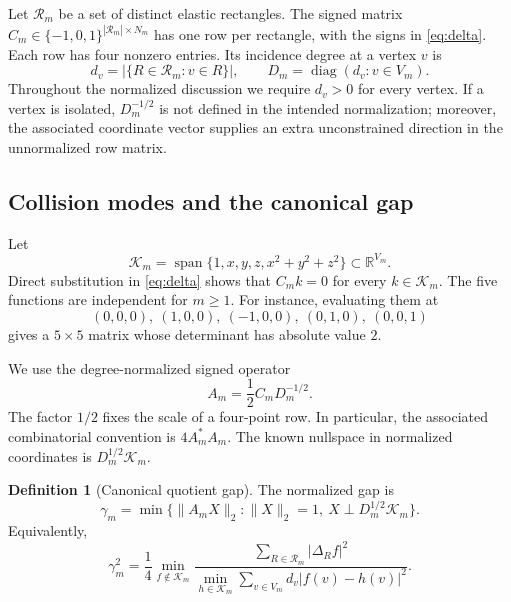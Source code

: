 \documentclass[11pt]{article}
\theoremstyle{definition}
\newtheorem{definition}[theorem]{Definition}
\theoremstyle{remark}
\newcommand{\norm}[1]{\lVert #1\rVert}
\begin{document}
Let $\mathcal R_m$ be a set of distinct elastic rectangles.  The signed
matrix $C_m\in\{-1,0,1\}^{|\mathcal R_m|\times N_m}$ has one row per
rectangle, with the signs in \eqref{eq:delta}.  Each row has four nonzero
entries.  Its incidence degree at a vertex $v$ is
\[
 d_v=|\{R\in\mathcal R_m:v\in R\}|,
 \qquad D_m=\operatorname{diag}(d_v:v\in V_m).
\]
Throughout the normalized discussion we require $d_v>0$ for every vertex.
If a vertex is isolated, $D_m^{-1/2}$ is not defined in the intended
normalization; moreover, the associated coordinate vector supplies an
extra unconstrained direction in the unnormalized row matrix.

\subsection{Collision modes and the canonical gap}

Let
\begin{equation}\label{eq:K}
 \mathcal K_m=\operatorname{span}\{1,x,y,z,x^2+y^2+z^2\}
 \subset\mathbb R^{V_m}.
\end{equation}
Direct substitution in \eqref{eq:delta} shows that $C_mk=0$ for every
$k\in\mathcal K_m$.  The five functions are independent for $m\geq1$.
For instance, evaluating them at
\[
 (0,0,0),\ (1,0,0),\ (-1,0,0),\ (0,1,0),\ (0,0,1)
\]
gives a $5\times5$ matrix whose determinant has absolute value $2$.

We use the degree-normalized signed operator
\begin{equation}\label{eq:A}
 A_m=\frac12 C_mD_m^{-1/2}.
\end{equation}
The factor $1/2$ fixes the scale of a four-point row.  In particular, the
associated combinatorial convention is $4A_m^*A_m$.  The known nullspace in
normalized coordinates is $D_m^{1/2}\mathcal K_m$.

\begin{definition}[Canonical quotient gap]\label{def:gap}
The normalized gap is
\begin{equation}\label{eq:gap}
 \gamma_m=\min\bigl\{\norm{A_mX}_2:
 \norm{X}_2=1,\ X\perp D_m^{1/2}\mathcal K_m\bigr\}.
\end{equation}
Equivalently,
\begin{equation}\label{eq:rayleigh}
 \gamma_m^2=\frac14\min_{f\notin\mathcal K_m}
 \frac{\sum_{R\in\mathcal R_m}|\Delta_Rf|^2}
 {\min_{h\in\mathcal K_m}\sum_{v\in V_m}d_v|f(v)-h(v)|^2}.
\end{equation}
\end{definition}
\end{document}
